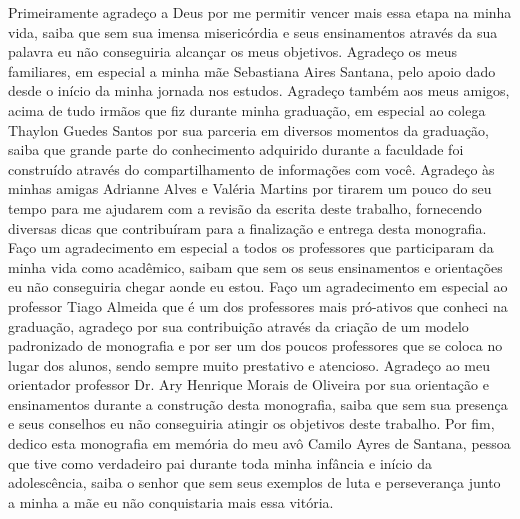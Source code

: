 \documentclass[tcc2]{uftex}
\begin{document}
  \begin{acknowledgement}

  Primeiramente agradeço a Deus por me permitir vencer mais essa etapa na minha vida, saiba que sem sua imensa misericórdia e seus ensinamentos através da sua palavra eu não conseguiria alcançar os meus objetivos. Agradeço os meus familiares, em especial a minha mãe Sebastiana Aires Santana, pelo apoio dado desde o início da minha jornada nos estudos. Agradeço também aos meus amigos, acima de tudo irmãos que fiz durante minha graduação, em especial ao colega Thaylon Guedes Santos por sua parceria em diversos momentos da graduação, saiba que grande parte do conhecimento adquirido durante a faculdade foi construído através do compartilhamento de informações com você. Agradeço às minhas amigas Adrianne Alves e Valéria Martins por tirarem um pouco do seu tempo para me ajudarem com a revisão da escrita deste trabalho, fornecendo diversas dicas que contribuíram para a finalização e entrega desta monografia. Faço um agradecimento em especial a todos os professores que participaram da minha vida como acadêmico, saibam que sem os seus ensinamentos e orientações eu não conseguiria chegar aonde eu estou. Faço um agradecimento em especial ao professor Tiago Almeida que é um dos professores mais pró-ativos que conheci na graduação, agradeço por sua contribuição através da criação de um modelo padronizado de monografia e por ser um dos poucos professores que se coloca no lugar dos alunos, sendo sempre muito prestativo e atencioso. Agradeço ao meu orientador professor Dr. Ary Henrique Morais de Oliveira por sua orientação e ensinamentos durante a construção desta monografia, saiba que sem sua presença e seus conselhos eu não conseguiria atingir os objetivos deste trabalho. Por fim, dedico esta monografia em memória do meu avô Camilo Ayres de Santana, pessoa que tive como verdadeiro pai durante toda minha infância e início da adolescência, saiba o senhor que sem seus exemplos de luta e perseverança junto a minha a mãe eu não conquistaria mais essa vitória.

  \end{acknowledgement}
\end{document}
